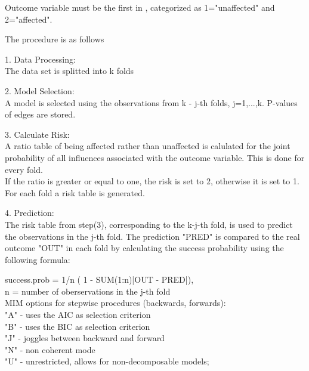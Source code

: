 \begin{Details}\relax
Outcome variable must be the first in , categorized as 
1="unaffected" and 2="affected".

The procedure is as follows

1. Data Processing:\\
The data set is splitted into k folds

2. Model Selection:\\
A model is selected using the observations from k - j-th folds, j=1,...,k.
P-values of edges are stored. 

3. Calculate Risk:\\
A ratio table of being affected rather than unaffected is calulated for the joint probability of all influences associated with the outcome variable.
This is done for every fold.\\    
If the ratio is greater or equal to one, the risk is set to 2, otherwise it is set to 1. For each fold a risk table is generated.

4. Prediction:\\
The risk table from step(3), corresponding to the k-j-th fold, is used to predict the observations in the j-th fold.
The prediction "PRED" is compared to the real outcome "OUT" in each fold by calculating the success probability using the following formula:

success.prob = 1/n ( 1 - SUM(1:n)|OUT - PRED|),\\
n = number of oberservations in the j-th fold \\

MIM options for stepwise procedures (backwards, forwards):\\
"A" - uses the AIC as selection criterion\\
"B" - uses the BIC as selection criterion\\
"J" - joggles between backward and forward\\
"N" - non coherent mode\\
"U" - unrestricted, allows for non-decomposable models;
\end{Details}
